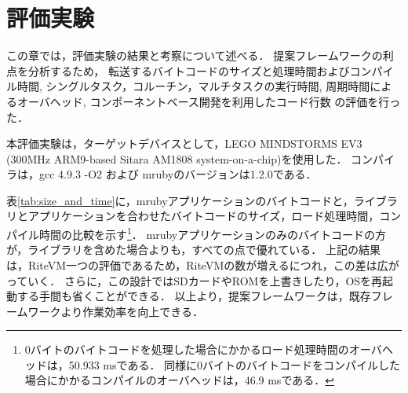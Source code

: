 \documentclass[submit,techrep]{ipsj}
\begin{document}
\section{評価実験}
\vspace{-2mm}
\label{sec:Evaluation}
この章では，評価実験の結果と考察について述べる．
提案フレームワークの利点を分析するため，
転送するバイトコードのサイズと処理時間およびコンパイル時間, 
シングルタスク，コルーチン，マルチタスクの実行時間, 
周期時間によるオーバヘッド,
コンポーネントベース開発を利用したコード行数
の評価を行った．

本評価実験は，ターゲットデバイスとして，LEGO MINDSTORMS EV3 (300MHz ARM9-based Sitara AM1808 system-on-a-chip)を使用した．
コンパイラは，gcc 4.9.3 -O2 および mrubyのバージョンは1.2.0である．

表\ref{tab:size_and_time}に，mrubyアプリケーションのバイトコードと，ライブラリとアプリケーションを合わせたバイトコードのサイズ，ロード処理時間，コンパイル時間の比較を示す\footnote{0バイトのバイトコードを処理した場合にかかるロード処理時間のオーバヘッドは，50.933 msである．
同様に0バイトのバイトコードをコンパイルした場合にかかるコンパイルのオーバヘッドは，46.9 msである．}．
mrubyアプリケーションのみのバイトコードの方が，ライブラリを含めた場合よりも，すべての点で優れている．
上記の結果は，RiteVM一つの評価であるため，RiteVMの数が増えるにつれ，この差は広がっていく．
さらに，この設計ではSDカードやROMを上書きしたり，OSを再起動する手間も省くことができる．
以上より，提案フレームワークは，既存フレームワークより作業効率を向上できる．
\end{document}
